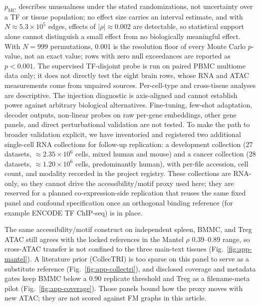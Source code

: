 \documentclass[fleqn,10pt,lineno]{wlpeerj}
\begin{document}
$p_{\mathrm{MC}}$ describes unusualness under the stated randomizations, not uncertainty over a TF
or tissue population; no effect size carries an interval estimate, and with
$N\approx5.3\times10^{5}$ edges, effects of $|\rho|\approx0.002$ are detectable, so statistical
support alone cannot distinguish a small effect from no biologically meaningful effect. With
$N=999$ permutations, 0.001 is the resolution floor of every Monte Carlo $p$-value, not an exact
value; rows with zero null exceedances are reported as $p<0.001$. The
supervised TF-disjoint probe is run on paired PBMC multiome data only; it does not directly
test the eight brain rows, whose RNA and ATAC measurements come from unpaired sources.
Per-cell-type and cross-tissue analyses are descriptive. The injection diagnostic is axis-aligned
and cannot establish power against arbitrary biological alternatives. Fine-tuning, few-shot
adaptation, decoder outputs, non-linear probes on raw per-gene embeddings, other gene panels, and
direct perturbational validation are not tested. To make the path to broader validation explicit,
we have inventoried and registered two additional single-cell RNA collections for follow-up
replication: a development collection (27 datasets, ${\approx}2.35\times10^{6}$ cells, mixed human
and mouse) and a cancer collection (28 datasets, ${\approx}1.20\times10^{6}$ cells, predominantly
human), with per-file accession, cell count, and modality recorded in the project registry. These
collections are RNA-only, so they cannot drive the accessibility/motif proxy used here; they are
reserved for a planned co-expression-side replication that reuses the same fixed panel and
confound specification once an orthogonal binding reference (for example ENCODE TF ChIP-seq) is
in place.

The same accessibility/motif construct on independent spleen, BMMC, and Treg ATAC still agrees with the locked references in the Mantel $\rho$ $0.39$--$0.89$ range, so cross-ATAC transfer is not confined to the three main-text tissues (Fig.~\ref{fig:app-mantel}). A literature prior (CollecTRI) is too sparse on this panel to serve as a substitute reference (Fig.~\ref{fig:app-collectri}), and disclosed coverage and metadata gates keep BMMC below a $0.90$ replicate threshold and Treg as a filename-meta pilot (Fig.~\ref{fig:app-coverage}). Those panels bound how the proxy moves with new ATAC; they are not scored against FM graphs in this article.
\end{document}
